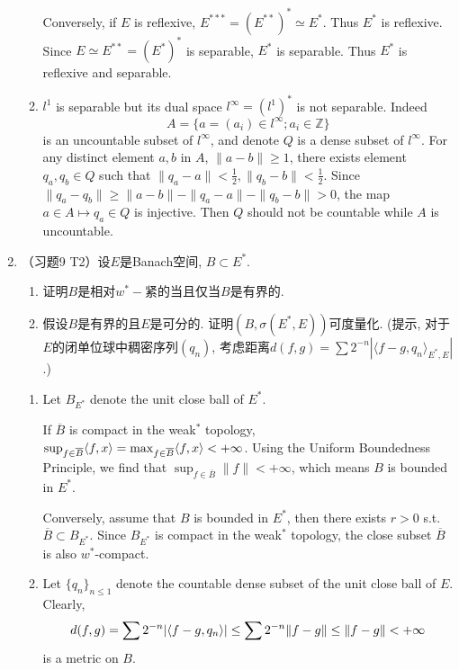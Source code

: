 \begin{enumerate}
\begin{answer}
\begin{enumerate}
        Conversely, if $E$ is reflexive, $E^{***} = (E^{**})^*\simeq E^{*}$. Thus $E^*$ is reflexive. Since $E\simeq E^{**} = (E^*)^*$ is separable, $E^*$ is separable. Thus $E^*$ is reflexive and separable.
        \item $l^1$ is separable but its dual space $l^{\infty}=(l^1)^*$ is not separable. Indeed
        \[A = \{a = (a_i)\in l^\infty;a_i\in \mathbb Z\}\]
        is an uncountable subset of $l^\infty$, and denote $Q$ is a dense subset of $l^\infty$. For any distinct element $a,b$ in $A$, $\|a - b\|\geq1$, there exists element $q_a, q_b\in Q$ such that $\|q_a - a\|<\frac12, \|q_b - b\|<\frac12$. Since $\|q_a - q_b\|\geq \|a - b\| -\|q_a - a\| - \|q_b - b\| > 0$, the map $a\in A\mapsto q_a\in Q$ is injective. Then $Q$ should not be countable while $A$ is uncountable.
      \end{enumerate}
    \end{answer}
  \item （习题9 T2）设$E$是Banach空间, $B\subset E^*$.
    \begin{enumerate}
        \item 证明$B$是相对$w^*-$紧的当且仅当$B$是有界的.
        \item 假设$B$是有界的且$E$是可分的. 证明$(B, \sigma(E^*, E))$可度量化. (提示, 对于$E$的闭单位球中稠密序列$(q_n)$, 考虑距离$d(f, g) = \sum 2^{-n}|\langle f-g, q_n\rangle_{E^*, E}|$.)
    \end{enumerate}
    \begin{answer}
      \begin{enumerate}
        \item Let $B_{E^*}$ denote the unit close ball of $E^*$.

        If $\overline B$ is compact in the weak$^*$ topology, $\sup_{f\in \overline B}\langle f,x\rangle = \max_{f\in \overline B} \langle f,x\rangle<+\infty$. Using the Uniform Boundedness Principle, we find that $\sup_{f\in\overline B}\|f\|<+\infty$, which means $B$ is bounded in $E^*$.

        Conversely, assume that $B$ is bounded in $E^*$, then there exists $r>0$ s.t. $\overline B\subset B_{E^*}$. Since $B_{E^*}$ is compact in the weak$^*$ topology, the close subset $\overline B$ is also $w^*$-compact.

        \item Let $\{q_n\}_{n \leq 1}$ denote the countable dense subset of the unit close ball of $E$. Clearly, \[d(f, g) = \sum 2^{-n}|\langle f-g,q_n\rangle|\leq \sum 2^{-n} \|f - g\|\leq \|f - g\|<+\infty\] is a metric on $B$.


\end{enumerate}
\end{answer}
\end{enumerate}
